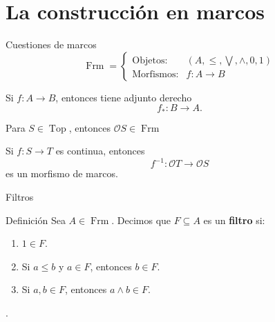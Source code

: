 \documentclass[compress,12pt]{beamer}
\DeclareMathOperator{\Frm}{Frm}
\DeclareMathOperator{\Top}{Top}
\begin{document}
\section{La construcción en marcos}

\begin{frame}{Cuestiones de marcos}
\[
\Frm=
\left\{
\begin{array}{ll}
\text{Objetos:} & (A,\leq, \bigvee, \wedge, 0, 1) 
\\[1mm]
\text{Morfismos:} & f\colon A\to B 
\end{array}
\right.
\]

Si $f\colon A\to B$, entonces tiene adjunto derecho
\[
f_*\colon B\to A.
\]

Para $S\in \Top$, entonces $\mathcal{O}S\in \Frm$

\vspace{1mm}

Si $f\colon S\to T$ es continua, entonces
\[
f^{-1}\colon\mathcal{O}T\to\mathcal{O}S
\]
es un morfismo de marcos.
\end{frame}

\begin{frame}{Filtros}
    \begin{block}{Definición}
    Sea $A\in \Frm$. Decimos que $F\subseteq A$ es un \textbf{filtro} si:
    \begin{enumerate}
      \item $1\in F$.
      \item Si $a\leq b$ y $a\in F$, entonces $b\in F$.
      \item Si $a, b\in F$, entonces $a\wedge b\in F$.
    \end{enumerate}
  \end{block}
  .

\end{frame}
\end{document}
